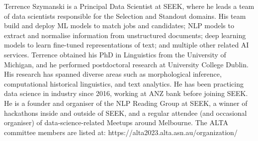 Terrence Szymanski is a Principal Data Scientist at SEEK, where he leads a team of data scientists responsible for the Selection and Standout domains. His team build and deploy ML models to match jobs and candidates; NLP models to extract and normalise information from unstructured documents; deep learning models to learn fine-tuned representations of text; and multiple other related AI services. Terrence obtained his PhD in Linguistics from the University of Michigan, and he performed postdoctoral research at University College Dublin. His research has spanned diverse areas such as morphological inference, computational historical linguistics, and text analytics. He has been practicing data science in industry since 2016, working at ANZ bank before joining SEEK. He is a founder and organiser of the NLP Reading Group at SEEK, a winner of hackathons inside and outside of SEEK, and a regular attendee (and occasional organiser) of data-science-related Meetups around Melbourne.
The ALTA committee members are listed at:
https://alta2023.alta.asn.au/organization/
